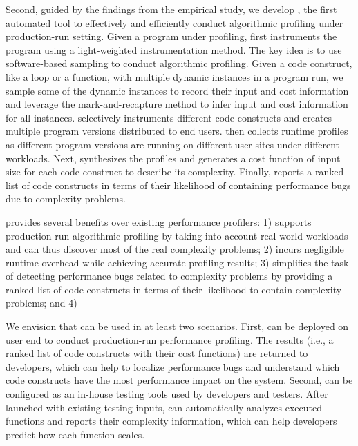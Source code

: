 Second, guided by the findings from the empirical
study, we develop \Tool, the first automated tool to effectively and efficiently 
conduct algorithmic profiling under production-run setting.
Given a program under profiling, \Tool first instruments the program
using a light-weighted instrumentation method. 
The key idea is to use software-based sampling to conduct algorithmic profiling.
Given a code construct, like a loop or a function,  
with multiple dynamic instances in a program run,
we sample some of the dynamic instances to record their input and cost information
and leverage the mark-and-recapture
method \citep{mark-recapture} to infer input and cost information for all instances.
\Tool selectively instruments different code constructs and 
creates multiple program versions distributed to end users.
\Tool then collects runtime profiles as different program versions are running
on different user sites under different workloads.
Next, \Tool synthesizes the profiles and generates a cost function of input size
for each code construct to describe its complexity. 
Finally, \Tool  reports a ranked list of code constructs in terms of their likelihood
of containing performance bugs due to complexity problems.  





\Tool provides several benefits over existing performance profilers:
1) \Tool supports production-run algorithmic profiling by taking into account
real-world workloads and can thus discover most of the real complexity problems;
2) \Tool incurs negligible runtime overhead while achieving accurate profiling results;
3) \Tool  simplifies the task of detecting performance bugs related to complexity
problems by providing a ranked list of code constructs in terms of their
likelihood to contain complexity problems;
and 4)  

We envision that \Tool can be used in at least two scenarios. 
First, \Tool can be deployed on user end to conduct production-run performance
profiling. The results (i.e., a ranked list of code constructs with their cost functions)
are returned to developers, which can help to localize performance 
bugs and understand 
which code constructs have the most performance impact on the system.
Second, \Tool can be configured as an in-house testing tools used by 
developers and testers. After launched with existing testing inputs, 
\Tool can automatically analyzes executed functions and 
reports their complexity information,
which can help developers predict how each function scales. 


